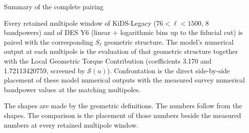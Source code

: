 Summary of the complete pairing

Every retained multipole window of KiDS-Legacy (\(76<\ell<1500\), 8 bandpowers) and of DES Y6 (linear + logarithmic bins up to the fiducial cut) is paired with the corresponding \(S_\ell\) geometric structure.  
The model’s numerical output at each multipole is the evaluation of that geometric structure together with the Local Geometric Torque Contribution (coefficients 3.170 and 1.72113420759, screened by \(\mathcal{S}(u)\)).  
Confrontation is the direct side-by-side placement of these model numerical outputs with the measured survey numerical bandpower values at the matching multipoles.

The shapes are made by the geometric definitions.  
The numbers follow from the shapes.  
The comparison is the placement of those numbers beside the measured numbers at every retained multipole window.
